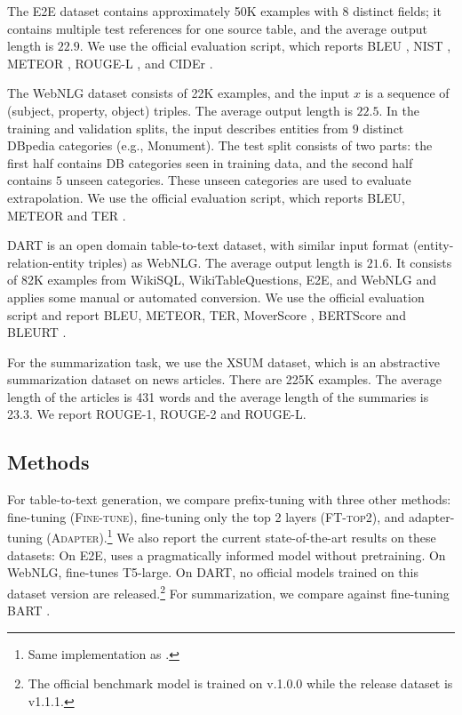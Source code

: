 \documentclass[11pt,a4paper]{article}
\newcommand{\exper}[1]{\textsc{#1}}
\newcommand{\adapter}{\exper{Adapter}}
\newcommand{\FTtop}{\exper{FT-top2}}
\newcommand{\FT}{\exper{Fine-tune}}
\newcommand\pl[1]{\textcolor{red}{[PL: #1]}}
\newcommand\lisa[1]{\textcolor{blue}{[Lisa: #1]}}
\begin{document}
The E2E dataset contains approximately 50K examples with 8 distinct fields; it contains multiple test references for one source table, and the average output length is $22.9$.  We use the official evaluation script, which reports  BLEU \cite{bleu}, NIST \cite{belz-reiter-nist}, METEOR \cite{Lavie-meteor}, ROUGE-L \cite{lin-2004-rouge}, and CIDEr \cite{cider}.

The WebNLG \cite{webnlg-2017} dataset consists of 22K
examples, and the input $x$ is a sequence of (subject, property, object) triples. The average output length is $22.5$. In the training and validation splits, the input describes entities from $9$ distinct DBpedia categories (e.g., Monument). 
The test split consists of two parts: the first half contains DB categories seen in training data, and the second half contains $5$ unseen categories.
These unseen categories are used to evaluate extrapolation. We use the official evaluation script, which reports BLEU, METEOR and TER \cite{ter}.  

DART \cite{radev2020dart} is an open domain table-to-text dataset, with similar input format (entity-relation-entity triples) as WebNLG. The average output length is $21.6$. It consists of 82K
examples from WikiSQL, WikiTableQuestions, E2E, and WebNLG and applies some manual or automated conversion. We use the official evaluation script and report BLEU, METEOR, TER, MoverScore \cite{zhao-etal-2019-moverscore}, BERTScore \cite{bert-score} and BLEURT \cite{sellam-etal-2020-bleurt}. 

For the summarization task, we use the XSUM \cite{xsum-emnlp} dataset, which is an abstractive summarization dataset on news articles. There are 225K examples. The average length of the articles is 431 words and the average length of the summaries is 23.3. We report ROUGE-1, ROUGE-2 and ROUGE-L. 

\subsection{Methods}
For table-to-text generation, we compare prefix-tuning with three other methods: fine-tuning (\FT), fine-tuning only the top 2 layers (\FTtop), and adapter-tuning (\adapter).\footnote{Same implementation as \citet{lin-etal-2020-exploring}.} We also report the current state-of-the-art results on these datasets: On E2E, \citet{shen-etal-2019-pragmatically} uses a pragmatically informed model without pretraining. On WebNLG, \citet{kale2020texttotext} fine-tunes T5-large. On DART, no official models trained on this dataset version are released.\footnote{The official benchmark model is trained on v.1.0.0 while the release dataset is v1.1.1.} For summarization, we compare against fine-tuning BART \cite{lewis-etal-2020-bart}. 
\end{document}
